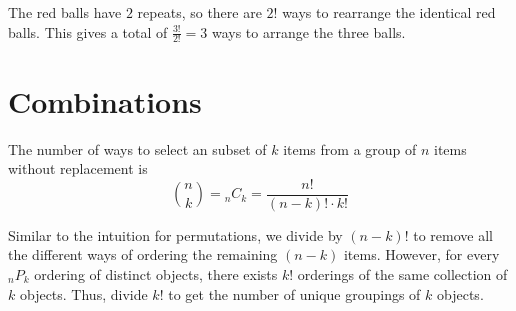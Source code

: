 \begin{example}
\begin{itemize}
\begin{center}
        \end{center}

        The red balls have $2$ repeats, so there are $2!$ ways to rearrange the identical red balls. This gives a total of $\frac{3!}{2!} = 3$ ways to arrange the three balls. 
    \end{itemize}
\end{example}

\section{Combinations}

\begin{definition}[Combinations - ${}_nC_k$]
    The number of ways to select an  subset of $k$ items from a group of $n$  items without replacement is $$\binom{n}{k} = {}_nC_k = \frac{n!}{(n - k)! \cdot k!}$$
\end{definition}

Similar to the intuition for permutations, we divide by $(n - k)!$ to remove all the different ways of ordering the remaining $(n - k)$ items. However, for every ${}_nP_k$ ordering of distinct objects, there exists $k!$ orderings of the same collection of $k$ objects. Thus, divide $k!$ to get the number of unique groupings of $k$ objects.

